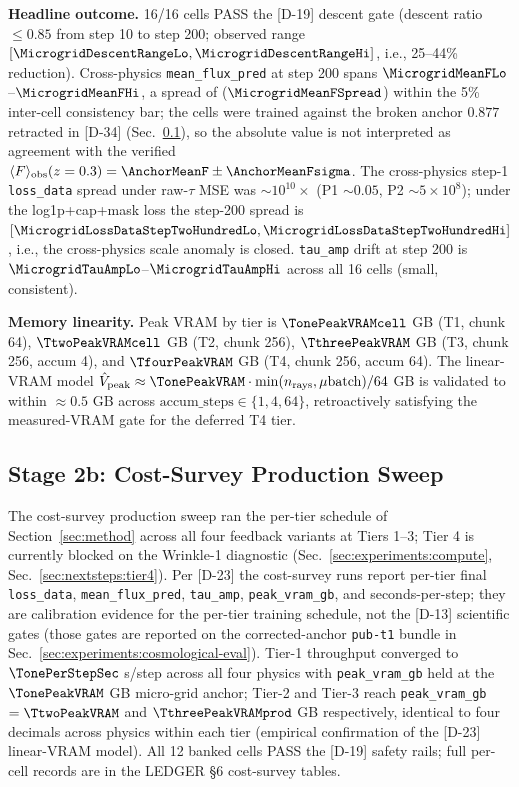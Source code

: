 \textbf{Headline outcome.} 16/16 cells PASS the [D-19] descent gate (descent ratio $\leq 0.85$ from step 10 to step 200; observed range $[\MicrogridDescentRangeLo, \MicrogridDescentRangeHi]$, i.e., 25--44\% reduction). Cross-physics \texttt{mean\_flux\_pred} at step 200 spans $\MicrogridMeanFLo$--$\MicrogridMeanFHi$, a spread of \textbf{\MicrogridMeanFSpreadAbs} ($\MicrogridMeanFSpread$) within the 5\% inter-cell consistency bar; the cells were trained against the broken anchor $0.877$ retracted in [D-34] (Sec.~\ref{sec:experiments:cost-survey-sweep}), so the absolute value is not interpreted as agreement with the verified $\langle F\rangle_{\text{obs}}(z=0.3) = \AnchorMeanF \pm \AnchorMeanFsigma$. The cross-physics step-1 \texttt{loss\_data} spread under raw-$\tau$ MSE was $\sim 10^{10} \times$ (P1 $\sim 0.05$, P2 $\sim 5 \times 10^{8}$); under the log1p+cap+mask loss the step-200 spread is $[\MicrogridLossDataStepTwoHundredLo, \MicrogridLossDataStepTwoHundredHi]$, i.e., the cross-physics scale anomaly is closed. \texttt{tau\_amp} drift at step 200 is $\MicrogridTauAmpLo$--$\MicrogridTauAmpHi$ across all 16 cells (small, consistent).

\textbf{Memory linearity.} Peak VRAM by tier is $\TonePeakVRAMcell$ GB (T1, chunk 64), $\TtwoPeakVRAMcell$ GB (T2, chunk 256), $\TthreePeakVRAM$ GB (T3, chunk 256, accum 4), and $\TfourPeakVRAM$ GB (T4, chunk 256, accum 64). The linear-VRAM model $\hat{V}_{\text{peak}} \approx \TonePeakVRAM \cdot \min(n_{\text{rays}}, \mu\text{batch}) / 64$ GB is validated to within $\approx 0.5$ GB across $\text{accum\_steps} \in \{1, 4, 64\}$, retroactively satisfying the measured-VRAM gate for the deferred T4 tier.

\subsection{Stage 2b: Cost-Survey Production Sweep}
\label{sec:experiments:cost-survey-sweep}
The cost-survey production sweep ran the per-tier schedule of Section~\ref{sec:method} across all four feedback variants at Tiers 1--3; Tier 4 is currently blocked on the Wrinkle-1 diagnostic (Sec.~\ref{sec:experiments:compute}, Sec.~\ref{sec:nextsteps:tier4}). Per [D-23] the cost-survey runs report per-tier final \texttt{loss\_data}, \texttt{mean\_flux\_pred}, \texttt{tau\_amp}, \texttt{peak\_vram\_gb}, and seconds-per-step; they are calibration evidence for the per-tier training schedule, not the [D-13] scientific gates (those gates are reported on the corrected-anchor \texttt{pub-t1} bundle in Sec.~\ref{sec:experiments:cosmological-eval}). Tier-1 throughput converged to $\TonePerStepSec$ s/step across all four physics with \texttt{peak\_vram\_gb} held at the $\TonePeakVRAM$ GB micro-grid anchor; Tier-2 and Tier-3 reach \texttt{peak\_vram\_gb} $= \TtwoPeakVRAM$ and $\TthreePeakVRAMprod$ GB respectively, identical to four decimals across physics within each tier (empirical confirmation of the [D-23] linear-VRAM model). All 12 banked cells PASS the [D-19] safety rails; full per-cell records are in the LEDGER \S6 cost-survey tables.

